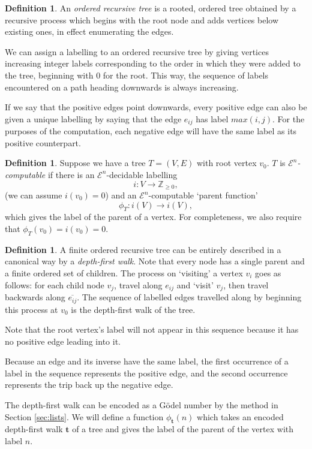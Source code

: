 \documentclass[a4paper]{article}
\newcommand{\grz}[1]{$\mathcal{E}^{#1}$}	%
\newcommand{\ZZ}{\mathbb{Z}}
\newcommand{\tvec}{\mathbf{t}}	%
\theoremstyle{plain}
\theoremstyle{definition}
\newtheorem{definition}[theorem]{Definition}
\begin{document}
\begin{definition}
An {\it ordered recursive tree} is a rooted, ordered tree obtained by a recursive process which begins with the root node and adds vertices below existing ones, in effect enumerating the edges.
\end{definition}

We can assign a labelling to an ordered recursive tree by giving vertices increasing integer labels corresponding to the order in which they were added to the tree, beginning with $0$ for the root. This way, the sequence of labels encountered on a path heading downwards is always increasing. 

If we say that the positive edges point downwards, every positive edge can also be given a unique labelling by saying that the edge $e_{ij}$ has label $max(i,j)$. For the purposes of the computation, each negative edge will have the same label as its positive counterpart.

\begin{definition}
	Suppose we have a tree $T=(V,E)$ with root vertex $v_0$. $T$ is {\it \grz{n}-computable} if there is an \grz{n}-decidable labelling 
	\[i: V \rightarrow \ZZ_{\geq 0},\]
(we can assume $i(v_0) = 0$) and an \grz{n}-computable `parent function'
\[\phi_T:i(V) \rightarrow i(V),\]
which gives the label of the parent of a vertex. For completeness, we also require that $\phi_T(v_0) = i(v_0) = 0$.
\end{definition}

\begin{definition}
A finite ordered recursive tree can be entirely described in a canonical way by a {\it depth-first walk}. Note that every node has a single parent and a finite ordered set of children. The process on `visiting' a vertex $v_i$ goes as follows: for each child node $v_j$, travel along $e_{ij}$ and `visit' $v_j$, then travel backwards along $\overline{e_{ij}}$. The sequence of labelled edges travelled along by beginning this process at $v_0$ is the depth-first walk of the tree.
\end{definition}

Note that the root vertex's label will not appear in this sequence because it has no positive edge leading into it. 

Because an edge and its inverse have the same label, the first occurrence of a label in the sequence represents the positive edge, and the second occurrence represents the trip back up the negative edge.

The depth-first walk can be encoded as a G\"odel number by the method in Section \ref{sec:lists}. We will define a function $\phi_{\tvec}(n)$ which takes an encoded depth-first walk $\tvec$ of a tree and gives the label of the parent of the 
vertex with label $n$. 
\end{document}
